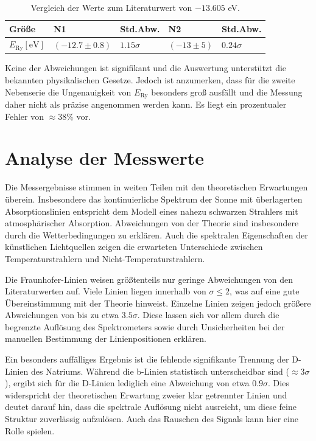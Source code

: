 \begin{table}[h!]
    \centering
    \caption{Vergleich der Werte zum Literaturwert von $-13.605$ eV.}
    \centering
    \begin{tabular}{l || l | l || l | l}
        \toprule
        \textbf{Größe} & \textbf{N1} & \textbf{Std.Abw.} & \textbf{N2} & \textbf{Std.Abw.} \\
        \midrule
        $E_\text{Ry} [\mathrm{eV}]$ & $(-12.7 \pm 0.8)$ & $1.15\sigma$ & $(-13 \pm 5)$ & $0.24\sigma$\\
        \bottomrule
    \end{tabular}
    \label{tab:werte_comparison_the}
\end{table}

Keine der Abweichungen ist signifikant und die Auswertung unterstützt die bekannten physikalischen Gesetze. Jedoch ist anzumerken, dass für die zweite Nebenserie die Ungenauigkeit von $E_\text{Ry}$ besonders groß ausfällt und die Messung daher nicht als präzise angenommen werden kann. Es liegt ein prozentualer Fehler von $\approx 38\%$ vor.

\section{Analyse der Messwerte}
\label{sec:Analyse}

Die Messergebnisse stimmen in weiten Teilen mit den theoretischen Erwartungen überein. Insbesondere das kontinuierliche Spektrum der Sonne mit überlagerten Absorptionslinien entspricht dem Modell eines nahezu schwarzen Strahlers mit atmosphärischer Absorption. Abweichungen von der Theorie sind insbesondere durch die Wetterbedingungen zu erklären.
Auch die spektralen Eigenschaften der künstlichen Lichtquellen zeigen die erwarteten Unterschiede zwischen Temperaturstrahlern und Nicht-Temperaturstrahlern.

Die Fraunhofer-Linien weisen größtenteils nur geringe Abweichungen von den Literaturwerten auf. Viele Linien liegen innerhalb von $\sigma \leq 2$, was auf eine gute Übereinstimmung mit der Theorie hinweist. Einzelne Linien zeigen jedoch größere Abweichungen von bis zu etwa $3.5\sigma$. Diese lassen sich vor allem durch die begrenzte Auflösung des Spektrometers sowie durch Unsicherheiten bei der manuellen Bestimmung der Linienpositionen erklären.

Ein besonders auffälliges Ergebnis ist die fehlende signifikante Trennung der D-Linien des Natriums. Während die b-Linien statistisch unterscheidbar sind ($\approx 3\sigma$), ergibt sich für die D-Linien lediglich eine Abweichung von etwa $0.9\sigma$. Dies widerspricht der theoretischen Erwartung zweier klar getrennter Linien und deutet darauf hin, dass die spektrale Auflösung nicht ausreicht, um diese feine Struktur zuverlässig aufzulösen. Auch das Rauschen des Signals kann hier eine Rolle spielen.

